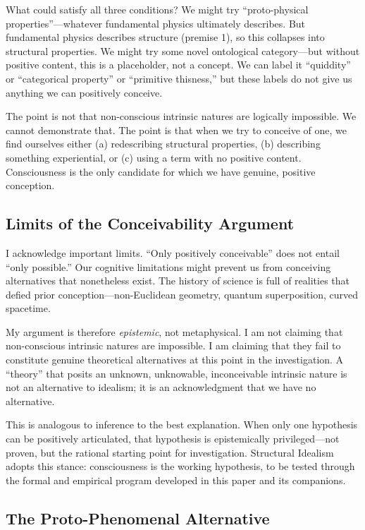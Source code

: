\documentclass[11pt,a4paper]{article}
\theoremstyle{definition}
\theoremstyle{plain}
\theoremstyle{remark}
\begin{document}
What could satisfy all three conditions? We might try ``proto-physical properties''---whatever fundamental physics ultimately describes. But fundamental physics describes structure (premise 1), so this collapses into structural properties. We might try some novel ontological category---but without positive content, this is a placeholder, not a concept. We can label it ``quiddity'' or ``categorical property'' or ``primitive thisness,'' but these labels do not give us anything we can positively conceive.

The point is not that non-conscious intrinsic natures are logically impossible. We cannot demonstrate that. The point is that when we try to conceive of one, we find ourselves either (a) redescribing structural properties, (b) describing something experiential, or (c) using a term with no positive content. Consciousness is the only candidate for which we have genuine, positive conception.

\subsection{Limits of the Conceivability Argument}\label{sec:limits}

I acknowledge important limits. ``Only positively conceivable'' does not entail ``only possible.'' Our cognitive limitations might prevent us from conceiving alternatives that nonetheless exist. The history of science is full of realities that defied prior conception---non-Euclidean geometry, quantum superposition, curved spacetime.

My argument is therefore \textit{epistemic}, not metaphysical. I am not claiming that non-conscious intrinsic natures are impossible. I am claiming that they fail to constitute genuine theoretical alternatives at this point in the investigation. A ``theory'' that posits an unknown, unknowable, inconceivable intrinsic nature is not an alternative to idealism; it is an acknowledgment that we have no alternative.

This is analogous to inference to the best explanation. When only one hypothesis can be positively articulated, that hypothesis is epistemically privileged---not proven, but the rational starting point for investigation. Structural Idealism adopts this stance: consciousness is the working hypothesis, to be tested through the formal and empirical program developed in this paper and its companions.

\subsection{The Proto-Phenomenal Alternative}\label{sec:proto}
\end{document}
